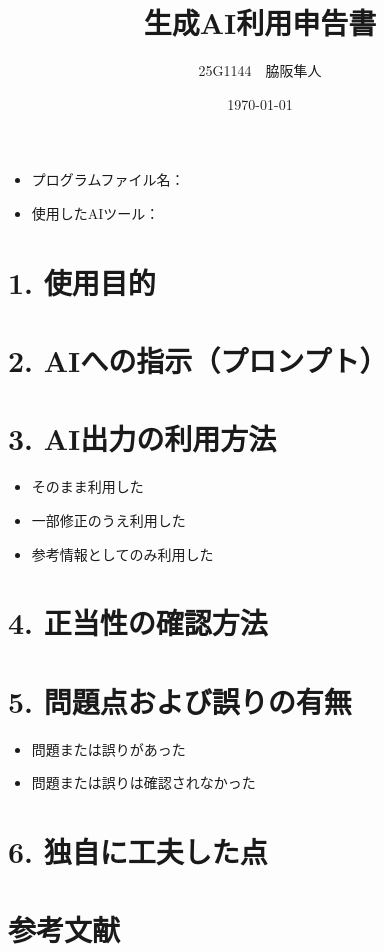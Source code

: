 \documentclass[uplatex]{jsarticle}
\title{生成AI利用申告書}
\author{25G1144　脇阪隼人}
\date{\today}
\begin{document}
\maketitle

\begin{itemize}
  \item プログラムファイル名：
  \item 使用したAIツール：
\end{itemize}

\section*{1. 使用目的}

\section*{2. AIへの指示（プロンプト）}

\section*{3. AI出力の利用方法}
\begin{itemize}
    \renewcommand{\labelitemi}{} 
    \item \Square そのまま利用した
    \item \Square 一部修正のうえ利用した
    \item \CheckedBox 参考情報としてのみ利用した
\end{itemize}

\section*{4. 正当性の確認方法}

\section*{5. 問題点および誤りの有無}
\begin{itemize}
\renewcommand{\labelitemi}{}
  \item \Square 問題または誤りがあった
  \item \CheckedBox 問題または誤りは確認されなかった
\end{itemize}


\section*{6. 独自に工夫した点}

\section*{参考文献}
\end{document}
